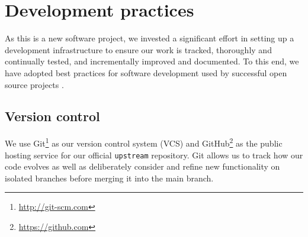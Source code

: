 \chapter{\label{ch:dev}Development practices}

As this is a new software project, we invested a significant effort in setting
up a development infrastructure to ensure our work is tracked,
thoroughly and continually tested, and incrementally improved and documented.
To this end, we have adopted best practices for software development used by
successful open source projects \cite{millman2014}.

\section{\label{sec:vc}Version control}

We use Git\footnote{\url{http://git-scm.com}} as our version control
system (VCS) and GitHub\footnote{\url{https://github.com}} as the public hosting
service for our official \texttt{upstream} repository.  Git allows us to
track how our code evolves as well as deliberately consider and
refine new functionality on isolated branches before merging it into the main
branch.


